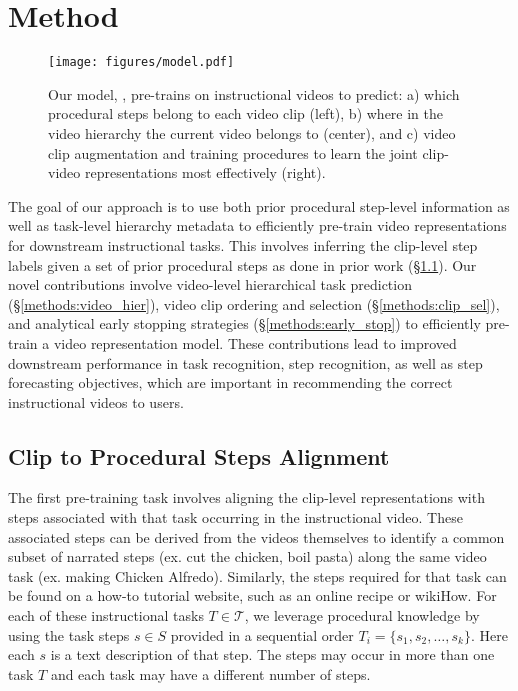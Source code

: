 \section{Method}

\begin{figure}[t]
\begin{center}
\texttt{[image: figures/model.pdf]}
\end{center}
\caption{Our model, \model{}, pre-trains on instructional videos to predict: a) which procedural steps belong to each video clip (left), b) where in the video hierarchy the current video belongs to (center), and c) video clip augmentation and training procedures to learn the joint clip-video representations most effectively (right).}
\end{figure}

The goal of our approach is to use both prior procedural step-level information as well as task-level hierarchy metadata to efficiently pre-train video representations for downstream instructional tasks. 
This involves inferring the clip-level step labels given a set of prior procedural steps as done in prior work (\S \ref{methods:clip_kg}). Our novel contributions involve video-level hierarchical task prediction (\S \ref{methods:video_hier}), video clip ordering and selection (\S \ref{methods:clip_sel}), and analytical early stopping strategies (\S \ref{methods:early_stop}) to efficiently pre-train a video representation model. These contributions lead to improved downstream performance in task recognition, step recognition, as well as step forecasting objectives, which are important in recommending the correct instructional videos to users.

\subsection{Clip to Procedural Steps Alignment}
\label{methods:clip_kg}

The first pre-training task involves aligning the clip-level representations with steps associated with that task occurring in the instructional video. These associated steps can be derived from the videos themselves to identify a common subset of narrated steps (ex. cut the chicken, boil pasta) along the same video task (ex. making Chicken Alfredo). Similarly, the steps required for that task can be found on a how-to tutorial website, such as an online recipe or wikiHow. For each of these instructional tasks $T \in \mathcal{T}$, we leverage procedural knowledge by using the task steps $s \in S$ provided in a sequential order $T_i = \{s_1, s_2, \dots, s_k\}$. Here each $s$ is a text description of that step. The steps may occur in more than one task $T$ and each task may have a different number of steps.

